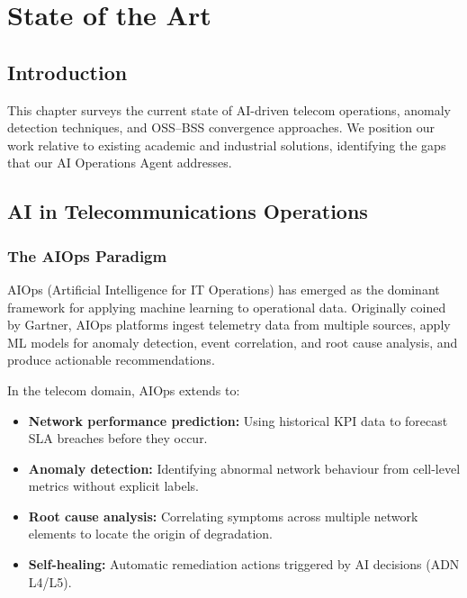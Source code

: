 \chapter{State of the Art}
\label{ch:stateofart}

\section{Introduction}

This chapter surveys the current state of AI-driven telecom operations, anomaly detection techniques, and OSS--BSS convergence approaches. We position our work relative to existing academic and industrial solutions, identifying the gaps that our AI Operations Agent addresses.

\section{AI in Telecommunications Operations}

\subsection{The AIOps Paradigm}

AIOps (Artificial Intelligence for IT Operations) has emerged as the dominant framework for applying machine learning to operational data. Originally coined by Gartner, AIOps platforms ingest telemetry data from multiple sources, apply ML models for anomaly detection, event correlation, and root cause analysis, and produce actionable recommendations.

In the telecom domain, AIOps extends to:
\begin{itemize}
  \item \textbf{Network performance prediction:} Using historical KPI data to forecast SLA breaches before they occur.
  \item \textbf{Anomaly detection:} Identifying abnormal network behaviour from cell-level metrics without explicit labels.
  \item \textbf{Root cause analysis:} Correlating symptoms across multiple network elements to locate the origin of degradation.
  \item \textbf{Self-healing:} Automatic remediation actions triggered by AI decisions (ADN L4/L5).
\end{itemize}

